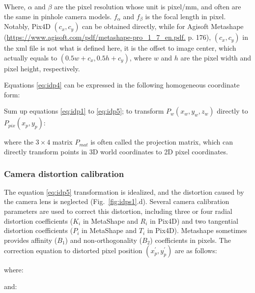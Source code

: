 

\noindent 
Where, $\alpha$ and $\beta$ are the pixel resolution whose unit is pixel/mm, and often are the same in pinhole camera models. $f_{\alpha}$ and $f_{\beta}$ is the focal length in pixel. Notably, Pix4D $(c_x,c_y)$ can be obtained directly, while for Agisoft Metashape (\url{https://www.agisoft.com/pdf/metashape-pro_1_7_en.pdf.} p. 176), $(c_x,c_y)$ in the xml file is not what is defined here, it is the offset to image center, which actually equals to $(0.5w+c_x,0.5h+c_y)$, where $w$ and $h$ are the pixel width and pixel height, respectively.

Equations \eqref{eq:idp4} can be expressed in the following homogeneous coordinate form: 



Sum up equations \eqref{eq:idp1} to \eqref{eq:idp5}; to transform $P_w (x_w,y_w,z_w)$ directly to $P_{pix} (x_p,y_p)$:



\noindent
where the $3\times4$ matrix $P_{mat}$ is often called the projection matrix, which can directly transform points in 3D world coordinates to 2D pixel coordinates.

\subsubsection{Camera distortion calibration}

The equation \eqref{eq:idp5} transformation is idealized, and the distortion caused by the camera lens is neglected (Fig.~\ref{fig:idps1}.d). Several camera calibration parameters are used to correct this distortion, including three or four radial distortion coefficients ($K_i$ in MetaShape and $R_i$ in Pix4D) and two tangential distortion coefficients ($P_i$ in MetaShape and $T_i$ in Pix4D). Metashape sometimes provides affinity ($B_1$) and non-orthogonality ($B_2$) coefficients in pixels. The correction equation to distorted pixel position $(x_p^\prime,y_p^\prime)$ are as follows:



\noindent
where:



\noindent
and: 

